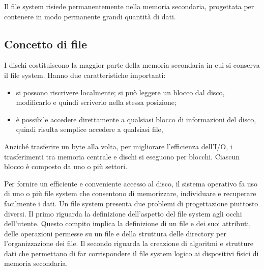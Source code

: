 \documentclass[11pt,a4paper]{article}
\begin{document}
{Il file system risiede perma­nentemente nella memoria secondaria, progettata per contenere in modo permanente grandi quantità di dati.

\subsection{Concetto di file}
I dischi costituiscono la maggior parte della memoria secondaria in cui si conserva il file sy­stem. Hanno due caratteristiche importanti:
\begin{itemize}
  \item si possono riscrivere localmente; si può leggere un blocco dal disco, modificarlo e quindi scriverlo nella stessa posizione;
  \item è possibile accedere direttamente a qualsiasi blocco di informazioni del disco, quindi risulta semplice accedere a qualsiasi file,
\end{itemize}
%
Anziché trasferire un byte alla volta, per migliorare l'efficienza dell'I/O, i trasferimenti
tra memoria centrale e dischi si eseguono per blocchi. Ciascun blocco è composto da uno o
più settori.

Per fornire un efficiente e conveniente accesso al disco, il sistema operativo fa uso di
uno o più file system che consentono di memorizzare, individuare e recuperare facilmente i
dati. Un file system presenta due problemi di progettazione piuttosto diversi. Il primo ri­guarda la definizione dell'aspetto del file system agli occhi dell'utente. Questo compito im­plica la definizione di un file e dei suoi attributi, delle operazioni permesse su un file e della
struttura delle directory per l'organizzazione dei file. Il secondo riguarda la creazione di al­goritmi e strutture dati che permettano di far corrispondere il file system logico ai dispositi­vi fisici di memoria secondaria.

}
\end{document}

